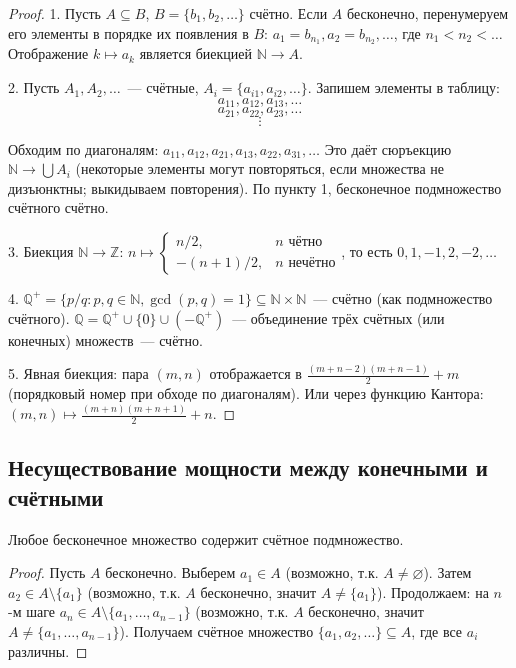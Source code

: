 \documentclass[12pt]{article}
\begin{document}
	\begin{proof}
		1. Пусть $A \subseteq B$, $B = \{b_1, b_2, \dots\}$ счётно. Если $A$ бесконечно, перенумеруем его элементы в порядке их появления в $B$: $a_1 = b_{n_1}, a_2 = b_{n_2}, \dots$, где $n_1 < n_2 < \dots$ Отображение $k \mapsto a_k$ является биекцией $\mathbb{N} \to A$.
		
		2. Пусть $A_1, A_2, \dots$~--- счётные, $A_i = \{a_{i1}, a_{i2}, \dots\}$. Запишем элементы в таблицу:
		\[a_{11}, a_{12}, a_{13}, \dots\]
		\[a_{21}, a_{22}, a_{23}, \dots\]
		\[\vdots\]
		
		Обходим по диагоналям: $a_{11}, a_{12}, a_{21}, a_{13}, a_{22}, a_{31}, \dots$ Это даёт сюръекцию $\mathbb{N} \to \bigcup A_i$ (некоторые элементы могут повторяться, если множества не дизъюнктны; выкидываем повторения). По пункту 1, бесконечное подмножество счётного счётно.
		
		3. Биекция $\mathbb{N} \to \mathbb{Z}$: $n \mapsto \begin{cases} n/2, & n \text{ чётно} \\ -(n+1)/2, & n \text{ нечётно} \end{cases}$, то есть $0, 1, -1, 2, -2, \dots$
		
		4. $\mathbb{Q}^+ = \{p/q : p, q \in \mathbb{N}, \gcd(p,q) = 1\} \subseteq \mathbb{N} \times \mathbb{N}$~--- счётно (как подмножество счётного). $\mathbb{Q} = \mathbb{Q}^+ \cup \{0\} \cup (-\mathbb{Q}^+)$~--- объединение трёх счётных (или конечных) множеств~--- счётно.
		
		5. Явная биекция: пара $(m, n)$ отображается в $\frac{(m+n-2)(m+n-1)}{2} + m$ (порядковый номер при обходе по диагоналям). Или через функцию Кантора: $(m, n) \mapsto \frac{(m+n)(m+n+1)}{2} + n$.
	\end{proof}
	
	\subsection{Несуществование мощности между конечными и счётными}
	
	\begin{theorem}
		Любое бесконечное множество содержит счётное подмножество.
	\end{theorem}
	
	\begin{proof}
		Пусть $A$ бесконечно. Выберем $a_1 \in A$ (возможно, т.к. $A \neq \varnothing$). Затем $a_2 \in A \setminus \{a_1\}$ (возможно, т.к. $A$ бесконечно, значит $A \neq \{a_1\}$). Продолжаем: на $n$-м шаге $a_n \in A \setminus \{a_1, \dots, a_{n-1}\}$ (возможно, т.к. $A$ бесконечно, значит $A \neq \{a_1, \dots, a_{n-1}\}$). Получаем счётное множество $\{a_1, a_2, \dots\} \subseteq A$, где все $a_i$ различны.
	\end{proof}
	
\end{document}
